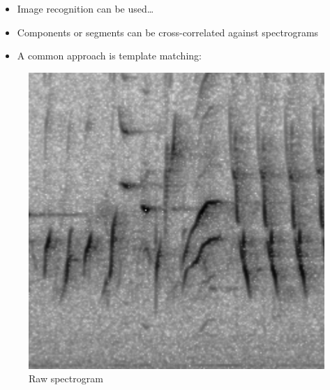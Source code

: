 \documentclass[t, xcolor={dvipsnames}]{beamer}
\begin{document}
\begin{frame}[fragile]
  \vspace{0.5cm}
  \begin{addmargin}{0.5cm}
    \begin{itemize}
      \item Image recognition can be used\ldots
      \item Components or segments can be cross-correlated against spectrograms
      \item A common approach is template matching:
    \end{itemize}
  \end{addmargin}

    \begin{figure}[!tbp]
      \centering
      \begin{minipage}[c]{0.3\textwidth}
        \includegraphics[width=\textwidth]{img/specgram}\\
        {\tiny Raw spectrogram}
      \end{minipage}
      \hfill
      \begin{minipage}[c]{0.3\textwidth}

\end{minipage}
\end{figure}
\end{frame}
\end{document}
